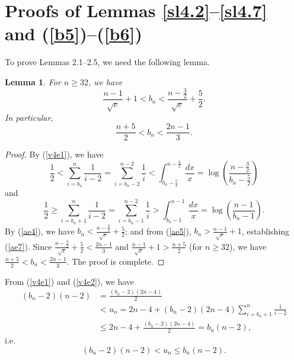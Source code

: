 \documentclass[12pt, A4paper, oneside]{article}
\theoremstyle{plain}
\newtheorem{lem}{Lemma}[section]
\numberwithin{equation}{section}
\begin{document}
\section{Proofs of Lemmas \ref{sl4.2}--\ref{sl4.7} and (\ref{b5})--(\ref{b6})}
\hspace*{18pt}To prove Lemmas 2.1--2.5, we need the following lemma.
\begin{lem}\label{sl4.1}
For $n\ge32$, we have
\begin{equation}\label{ae7}
\frac{n-1}{\sqrt{e}}+1<b_n<\frac{n-\frac{3}{2}}{\sqrt{e}}+\frac{5}{2}.
\end{equation}
In particular,
\begin{equation}\label{ae8}
\frac{n+5}{2}<b_n<\frac{2n-1}{3}.
\end{equation}
\end{lem}
\begin{proof}
By (\ref{v4e1}), we have
\begin{equation}\label{ae4}
\frac{1}{2}<\sum_{i=b_n}^{n}\frac{1}{i-2}=\sum_{i=b_n-2}^{n-2}\frac{1}{i}<\int_{b_n-\frac{5}{2}}^{n-\frac{3}{2}}\frac{dx}{x}=\log\left(\frac{n-\frac{3}{2}}{b_n-\frac{5}{2}}\right)
\end{equation}
and
\begin{equation}\label{ae5}
\frac{1}{2}\ge\sum_{i=b_n+1}^{n}\frac{1}{i-2}=\sum_{i=b_n-1}^{n-2}\frac{1}{i}>\int_{b_n-1}^{n-1}\frac{dx}{x}=\log\left(\frac{n-1}{b_n-1}\right).
\end{equation}
By (\ref{ae4}), we have $b_n<\frac{n-\frac{3}{2}}{\sqrt{e}}+\frac{5}{2}$; and from (\ref{ae5}), $b_n>\frac{n-1}{\sqrt{e}}+1$, establishing (\ref{ae7}). Since $\frac{n-\frac{3}{2}}{\sqrt{e}}+\frac{5}{2}<\frac{2n-1}{3}$ and $\frac{n-1}{\sqrt{e}}+1>\frac{n+5}{2}$ (for $n\ge32$), we have $\frac{n+5}{2}<b_n<\frac{2n-1}{3}$. The proof is complete.
\end{proof}

From (\ref{v4e1}) and (\ref{v4e2}), we have
\begin{align*}
(b_n-2)(n-2)&=\frac{(b_n-2)(2n-4)}{2}\\
&<u_n=2n-4+(b_n-2)(2n-4)\sum_{i=b_n+1}^n\frac{1}{i-2}\\
&\le 2n-4+\frac{(b_n-2)(2n-4)}{2}=b_n(n-2),
\end{align*}
i.e.
\begin{equation}\label{ae6}
(b_n-2)(n-2)<u_n\le b_n(n-2).
\end{equation}
\end{document}
